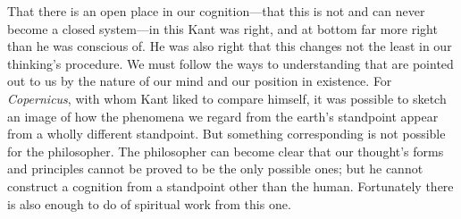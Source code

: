 \documentclass[12pt,a4paper]{book}
\newcommand{\opage}[1]{\marginnote{\footnotesize\textit{[#1]}}}
\begin{document}
That there is an open place in our cognition---that this is not and can never
become a closed system---in this Kant was right, and at bottom far more right
than he was conscious of. He was also right that this changes not the least in
our thinking's procedure. We must follow the ways to \opage{264}understanding that are
pointed out to us by the nature of our mind and our position in existence. For
\emph{Copernicus}, with whom Kant liked to compare himself, it was possible to
sketch an image of how the phenomena we regard from the earth's standpoint
appear from a wholly different standpoint. But something corresponding is not
possible for the philosopher. The philosopher can become clear that our
thought's forms and principles cannot be proved to be the only possible ones;
but he cannot construct a cognition from a standpoint other than the human. Fortunately
there is also enough to do of spiritual work from this one.
\end{document}
